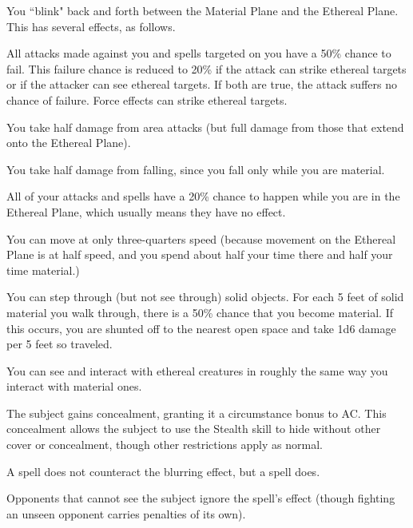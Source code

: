 \spellrng{\rngpers}
\begin{spelleffect}
  You ``blink" back and forth between the Material Plane and the Ethereal Plane. This has several effects, as follows.
  \begin{itemize*}
    \item All attacks made against you and spells targeted on you have a 50\% chance to fail. This failure chance is reduced to 20\% if the attack can strike ethereal targets or if the attacker can see ethereal targets. If both are true, the attack suffers no chance of failure. Force effects can strike ethereal targets.
    \item You take half damage from area attacks (but full damage from those that extend onto the Ethereal Plane).
    \item You take half damage from falling, since you fall only while you are material.
    \item All of your attacks and spells have a 20\% chance to happen while you are in the Ethereal Plane, which usually means they have no effect.
    \item You can move at only three-quarters speed (because movement on the Ethereal Plane is at half speed, and you spend about half your time there and half your time material.)
    \item You can step through (but not see through) solid objects. For each 5 feet of solid material you walk through, there is a 50\% chance that you become material. If this occurs, you are shunted off to the nearest open space and take 1d6 damage per 5 feet so traveled. 
    \item You can see and interact with ethereal creatures in roughly the same way you interact with material ones.
  \end{itemize*}
\end{spelleffect}

\spellrng{\rngclose}
\begin{spelleffect}
  The subject gains concealment, granting it a  circumstance bonus to AC. This concealment allows the subject to use the Stealth skill to hide without other cover or concealment, though other restrictions apply as normal.
\end{spelleffect}
\begin{spellnotes}
  A  spell does not counteract the blurring effect, but a  spell does.
  \par Opponents that cannot see the subject ignore the spell's effect (though fighting an unseen opponent carries penalties of its own).
\end{spellnotes}

